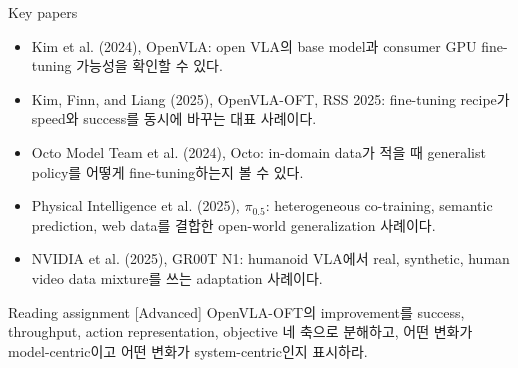 \begin{sourcebox}{Key papers}
\begin{itemize}
  \item Kim et al. (2024), OpenVLA: open VLA의 base model과 consumer GPU fine-tuning 가능성을 확인할 수 있다.
  \item Kim, Finn, and Liang (2025), OpenVLA-OFT, RSS 2025: fine-tuning recipe가 speed와 success를 동시에 바꾸는 대표 사례이다.
  \item Octo Model Team et al. (2024), Octo: in-domain data가 적을 때 generalist policy를 어떻게 fine-tuning하는지 볼 수 있다.
  \item Physical Intelligence et al. (2025), \(\pi_{0.5}\): heterogeneous co-training, semantic prediction, web data를 결합한 open-world generalization 사례이다.
  \item NVIDIA et al. (2025), GR00T N1: humanoid VLA에서 real, synthetic, human video data mixture를 쓰는 adaptation 사례이다.
\end{itemize}
\end{sourcebox}

\begin{assignmentbox}{Reading assignment [Advanced]}
OpenVLA-OFT의 improvement를 success, throughput, action representation, objective 네 축으로 분해하고, 어떤 변화가 model-centric이고 어떤 변화가 system-centric인지 표시하라.
\end{assignmentbox}
